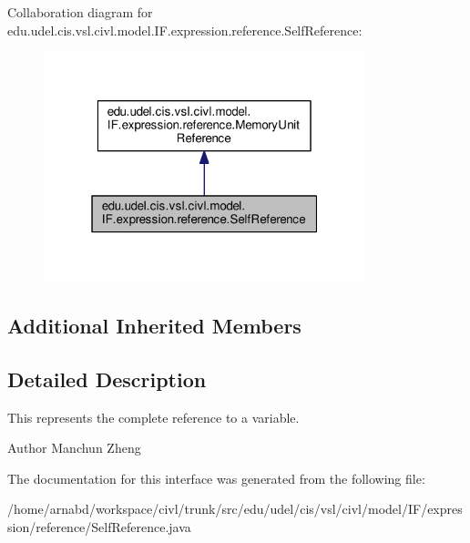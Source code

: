 Collaboration diagram for edu.\+udel.\+cis.\+vsl.\+civl.\+model.\+I\+F.\+expression.\+reference.\+Self\+Reference\+:
\nopagebreak
\begin{figure}[H]
\begin{center}
\leavevmode
\includegraphics[width=265pt]{interfaceedu_1_1udel_1_1cis_1_1vsl_1_1civl_1_1model_1_1IF_1_1expression_1_1reference_1_1SelfReference__coll__graph}
\end{center}
\end{figure}
\subsection*{Additional Inherited Members}


\subsection{Detailed Description}
This represents the complete reference to a variable. 

\begin{DoxyAuthor}{Author}
Manchun Zheng 
\end{DoxyAuthor}


The documentation for this interface was generated from the following file\+:\begin{DoxyCompactItemize}
\item 
/home/arnabd/workspace/civl/trunk/src/edu/udel/cis/vsl/civl/model/\+I\+F/expression/reference/Self\+Reference.\+java\end{DoxyCompactItemize}

